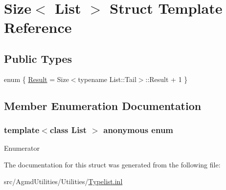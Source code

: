\hypertarget{struct_size}{\section{Size$<$ List $>$ Struct Template Reference}
\label{struct_size}
}
\subsection*{Public Types}
\begin{DoxyCompactItemize}
\item 
enum \{ \hyperlink{struct_size_a3c37654013e7229d40eb64799531bdcda8c745a71bd089f43d742b953a9452502}{Result} = Size$<$typename List\+:\+:Tail$>$\+:\+:Result + 1
 \}
\end{DoxyCompactItemize}


\subsection{Member Enumeration Documentation}
\hypertarget{struct_size_a3c37654013e7229d40eb64799531bdcd}{\subsubsection[{anonymous enum}]{\setlength{\rightskip}{0pt plus 5cm}template$<$class List $>$ anonymous enum}}\label{struct_size_a3c37654013e7229d40eb64799531bdcd}
\begin{Desc}
\item[Enumerator]\par
\begin{description}
\item[{\em 
\hypertarget{struct_size_a3c37654013e7229d40eb64799531bdcda8c745a71bd089f43d742b953a9452502}{Result}\label{struct_size_a3c37654013e7229d40eb64799531bdcda8c745a71bd089f43d742b953a9452502}
}]\end{description}
\end{Desc}


The documentation for this struct was generated from the following file\+:\begin{DoxyCompactItemize}
\item 
src/\+Agmd\+Utilities/\+Utilities/\hyperlink{_typelist_8inl}{Typelist.\+inl}\end{DoxyCompactItemize}
